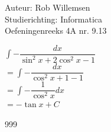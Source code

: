 \documentclass[a4paper]{article}
\newcommand{\dint}{\displaystyle\int}
\begin{document}
\noindent \large Auteur: Rob Willemsen \\
\noindent \large Studierichting: Informatica \\
\noindent \large Oefeningenreeks 4A nr. 9.13 \\

\medskip

\normalsize

$\dint -\dfrac{dx}{\sin^2x + 2\cos^2x-1}$ \\

$= \dint -\dfrac{dx}{\cos^2x+1-1}$ \\

$= \dint -\dfrac{1}{\cos^2x}dx$ \\

$= -\tan x + C$ \\

\begin{thebibliography}{999}
\end{thebibliography}
\end{document}
